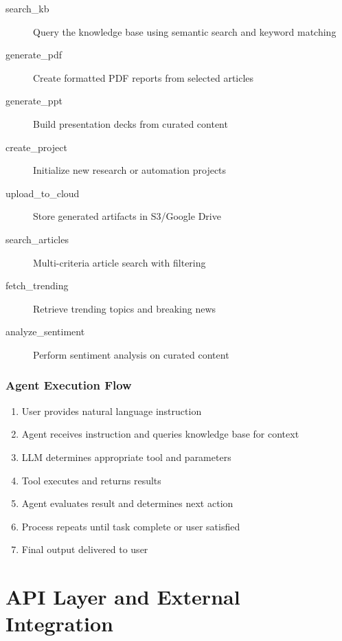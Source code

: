 \documentclass[12pt,a4paper]{report}
\begin{document}
\begin{description}
    \item[search\_kb] Query the knowledge base using semantic search and keyword matching
    \item[generate\_pdf] Create formatted PDF reports from selected articles
    \item[generate\_ppt] Build presentation decks from curated content
    \item[create\_project] Initialize new research or automation projects
    \item[upload\_to\_cloud] Store generated artifacts in S3/Google Drive
    \item[search\_articles] Multi-criteria article search with filtering
    \item[fetch\_trending] Retrieve trending topics and breaking news
    \item[analyze\_sentiment] Perform sentiment analysis on curated content
\end{description}

\subsection{Agent Execution Flow}

\begin{enumerate}
    \item User provides natural language instruction
    \item Agent receives instruction and queries knowledge base for context
    \item LLM determines appropriate tool and parameters
    \item Tool executes and returns results
    \item Agent evaluates result and determines next action
    \item Process repeats until task complete or user satisfied
    \item Final output delivered to user
\end{enumerate}

\newpage

\chapter{API Layer and External Integration}
\end{document}
